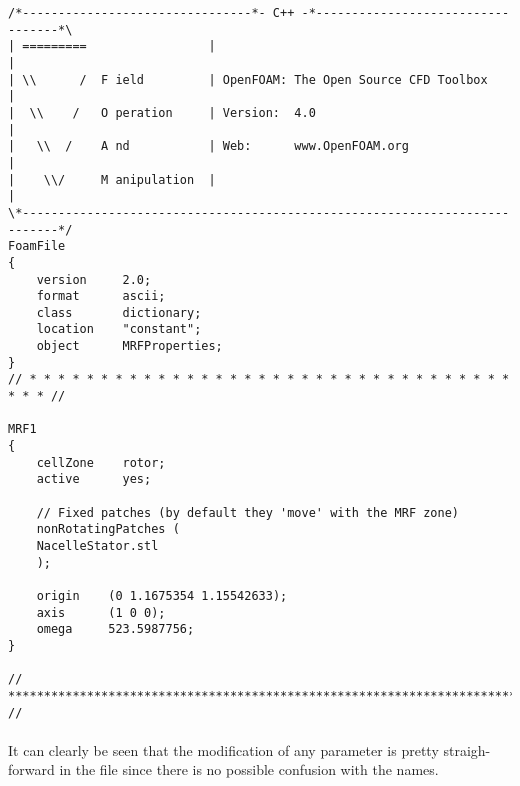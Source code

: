 \begin{footnotesize}
\begin{verbatim}
/*--------------------------------*- C++ -*----------------------------------*\
| =========                 |                                                 |
| \\      /  F ield         | OpenFOAM: The Open Source CFD Toolbox           |
|  \\    /   O peration     | Version:  4.0                                   |
|   \\  /    A nd           | Web:      www.OpenFOAM.org                      |
|    \\/     M anipulation  |                                                 |
\*---------------------------------------------------------------------------*/
FoamFile
{
    version     2.0;
    format      ascii;
    class       dictionary;
    location    "constant";
    object      MRFProperties;
}
// * * * * * * * * * * * * * * * * * * * * * * * * * * * * * * * * * * * * * //

MRF1
{
    cellZone    rotor;
    active      yes;

    // Fixed patches (by default they 'move' with the MRF zone)
    nonRotatingPatches (
	NacelleStator.stl
	);

    origin    (0 1.1675354 1.15542633);
    axis      (1 0 0);
    omega     523.5987756;
}

// ************************************************************************* //
\end{verbatim}
\end{footnotesize}

\paragraph{}It can clearly be seen that the modification of any parameter is pretty straigh-forward in the file since there is no possible confusion with the names.